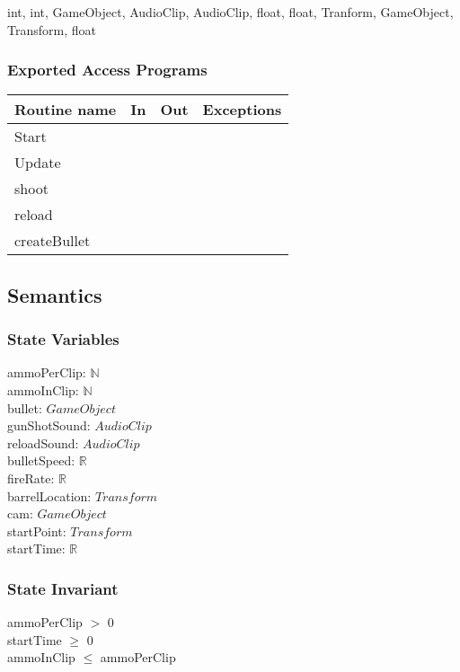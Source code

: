 \documentclass[12pt]{article}
\begin{document}
int, int, GameObject, AudioClip, AudioClip, float, float, Tranform, GameObject, Transform, float

\subsubsection* {Exported Access Programs}

\begin{tabular}{| l | l | l | l |}
	\hline
	\textbf{Routine name} & \textbf{In} & \textbf{Out} & \textbf{Exceptions}\\
	\hline
	Start & ~ & ~  & ~\\
	Update & ~ & ~  & ~\\
	shoot & ~ & ~  & ~\\
	reload & ~ & ~ & ~\\
	createBullet & ~ & ~ & ~\\
	\hline
\end{tabular}

\subsection* {Semantics}

\subsubsection* {State Variables}

ammoPerClip: $\mathbb{N}$\\
ammoInClip: $\mathbb{N}$\\
bullet: $GameObject$\\
gunShotSound: $AudioClip$\\
reloadSound: $AudioClip$\\
bulletSpeed: $\mathbb{R}$\\
fireRate: $\mathbb{R}$\\
barrelLocation: $Transform$\\
cam: $GameObject$\\
startPoint: $Transform$\\
startTime: $\mathbb{R}$\\
\subsubsection* {State Invariant}

ammoPerClip $>$ 0\\
startTime $\geq$ 0\\
ammoInClip $\leq$ ammoPerClip\\
\end{document}

